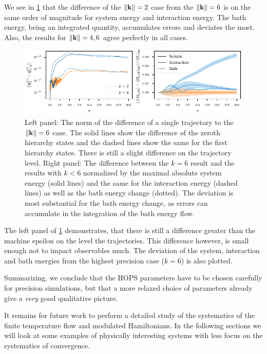 We see in \cref{fig:k_systematics_system} that the difference of the
\(\norm{\vb{k}} = 2\) case from the \(\norm{\vb{k}} = 6\) is on the
same order of magnitude for system energy and interaction energy. The
bath energy, being an integrated quantity, accumulates errors and
deviates the most. Also, the results for \(\norm{\vb{k}} = 4,6\) agree
perfectly in all cases.
\begin{figure}[htp]
  \centering
  \includegraphics{figs/one_bath_syst/k_systematics_system}
  \caption{\label{fig:k_systematics_system} Left panel: The norm of
    the difference of a single trajectory to the \(\norm{\vb{k}} = 6\)
    case. The solid lines show the difference of the zeroth hierarchy
    states and the dashed lines show the same for the first hierarchy
    states.  There is still a slight difference on the trajectory
    level. Right panel: The difference between the \(k=6\) result and
    the results with \(k<6\) normalized by the maximal absolute system
    energy (solid lines) and the same for the interaction energy
    (dashed lines) as well as the bath energy change (dotted). The
    deviation is most substantial for the bath energy change, as
    errors can accumulate in the integration of the bath energy flow.}
\end{figure}
The left panel of \cref{fig:k_systematics_system} demonstrates, that there is still a
difference greater than the machine epsilon on the level the
trajectories. This difference however, is small enough not to impact
observables much.  The deviation of the system, interaction and bath
energies from the highest precision case (\(k=6\)) is also
plotted.


Summarizing, we conclude that the HOPS parameters have to be chosen
carefully for precision simulations, but that a more relaxed choice of
parameters already give a \emph{very} good qualitative picture.

 It remains for future work
to perform a detailed study of the systematics of the finite
temperature flow and modulated Hamiltonians. In the following sections
we will look at some examples of physically interesting systems with
less focus on the systematics of convergence.

